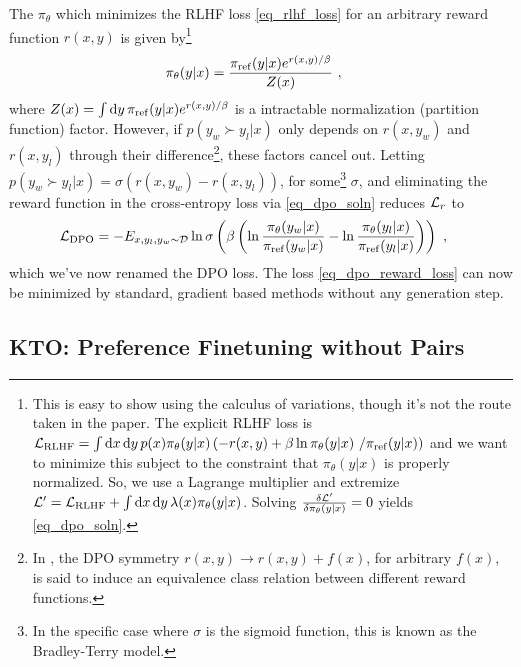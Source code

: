 \documentclass[11pt]{article}
\begin{document}
The $ \pi _{ \theta  } $ which minimizes the RLHF loss \eqref{eq_rlhf_loss} for
an arbitrary reward function $ r(x, y) $ is given by\footnote{This is easy to show using the
calculus of variations, though it's not the route taken in the paper. The explicit RLHF loss is $
\mathcal{L} _{ {\rm RLHF} } = \int {\rm d} x\,{\rm d} y\,p(x) \pi _{ \theta  }(y|x)\left ( -r(x,y) +\beta \ln \pi _{
\theta }(y|x)\ /\pi _{ {\rm ref} }(y|x) \right )  $ and we want to minimize this subject to the
constraint that $ \pi _{ \theta  }(y|x) $ is properly normalized. So, we use a Lagrange multiplier
and extremize $ \mathcal{L}'  = \mathcal{L} _{ {\rm RLHF} }+ \int {\rm d} x\,{\rm d} y\, \lambda (x) \pi _{ \theta
}(y|x)   $. Solving $ \frac{ \delta \mathcal{L} ' }{ \delta \pi _{ \theta  } (y|x)} =0$ yields
\eqref{eq_dpo_soln}.
}
\begin{align}
\pi _{\theta}(y|x) &= \frac{ \pi _{ {\rm ref}} (y|x)e ^{ r(x, y)/ \beta  }  }{ Z(x) } \ ,\label{eq_dpo_soln}
\end{align}
where $ Z(x) = \int {\rm d} y\, \pi _{ {\rm ref} }(y|x)e^{ r(x, y)/ \beta  }$ is a intractable
normalization (partition function) factor. However, if  $p(y _{ w } \succ y _{ l }| x )$ only
depends on $ r(x, y _{ w }) $ and $ r(x, y _{ l }) $ through their difference\footnote{In
\cite{rafailov2024directpreferenceoptimizationlanguage}, the DPO symmetry $ r(x, y)\longrightarrow r(x,
y) + f(x) $, for arbitrary $ f(x) $, is said to induce an equivalence class relation between
different reward functions.}, these factors cancel
out. Letting $ p(y _{ w } \succ y _{ l }| x ) = \sigma ( r(x, y _{ w })- r(x, y _{ l }) ) $, for
some\footnote{In the specific case where $ \sigma  $ is the sigmoid function, this is known as the
Bradley-Terry model.} $ \sigma  $, and eliminating the reward function in the cross-entropy loss via
\eqref{eq_dpo_soln} reduces $ \mathcal{L} _{ r } $ to
\begin{align}
    \mathcal{L} _{ {\rm DPO} } &= -E _{ x, y _{ l }, y _{ w } \sim \mathcal{D} } \ln \sigma \left (\beta \left (\ln \frac{ \pi _{
\theta }(y_{ w }|x ) }{ \pi _{ {\rm ref} }(y_{ w }|x ) }-\ln \frac{ \pi _{ \theta }(y _{ l }|x) }{ \pi
_{ {\rm ref} }(y _{  l}|x) }  \right )\right ) \ , \label{eq_dpo_reward_loss}
\end{align}
which we've now renamed the DPO loss.   The loss \eqref{eq_dpo_reward_loss} can now be minimized by
standard, gradient based methods without any generation step.



\subsection{KTO: Preference Finetuning without Pairs \label{subsec_kto}}
\end{document}
